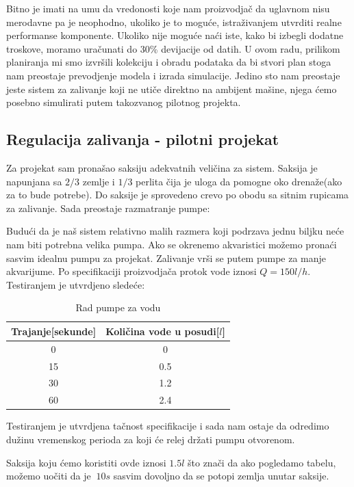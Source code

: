 \documentclass[a4paper,11pt]{book}
\begin{document}
\noindent Bitno je imati na umu da vredonosti koje nam proizvodjač da uglavnom nisu merodavne pa je neophodno, ukoliko je to moguće, istraživanjem utvrditi realne performanse komponente. Ukoliko nije moguće naći iste, kako bi izbegli dodatne troskove, moramo uračunati do 30\% devijacije od datih. U ovom radu, prilikom planiranja mi smo izvršili kolekciju i obradu podataka da bi stvori plan stoga nam preostaje prevodjenje modela i izrada simulacije. Jedino sto nam preostaje jeste sistem za zalivanje koji ne utiče direktno na ambijent mašine, njega ćemo posebno simulirati putem takozvanog pilotnog projekta. 


\subsection{Regulacija zalivanja - pilotni projekat}

Za projekat sam pronašao saksiju adekvatnih veličina za sistem. Saksija je napunjana sa $2/3$ zemlje i $1/3$ perlita čija je uloga da pomogne oko drenaže(ako za to bude potrebe). Do saksije je sprovedeno crevo po obodu sa sitnim rupicama za zalivanje. Sada preostaje razmatranje pumpe:

Budući da je naš sistem relativno malih razmera koji podrzava jednu biljku neće nam biti potrebna velika pumpa. Ako se okrenemo akvaristici možemo pronaći sasvim idealnu pumpu za projekat. 
Zalivanje vrši se putem pumpe za manje akvarijume. Po specifikaciji proizvodjača protok vode iznosi $Q = 150 l/h$. Testiranjem je utvrdjeno sledeće:

\begin{table}[ht]
  \caption{Rad pumpe za vodu}
  \centering
  \begin{tabular}{|c|c|}
  \hline
    Trajanje[sekunde] & Količina vode u posudi[$l$]\\ \hline
  0 & 0 \\ \hline
  15 & 0.5 \\ \hline
  30 & 1.2 \\ \hline
  60 & 2.4 \\ \hline
  \end{tabular}
\end{table}

Testiranjem je utvrdjena tačnost specifikacije i sada nam ostaje da odredimo dužinu vremenskog perioda za koji će relej držati pumpu otvorenom.

Saksija koju ćemo koristiti ovde iznosi $1.5l$ što znači da ako pogledamo tabelu, možemo uočiti da je $~10s$ sasvim dovoljno da se potopi zemlja unutar saksije.
\end{document}

